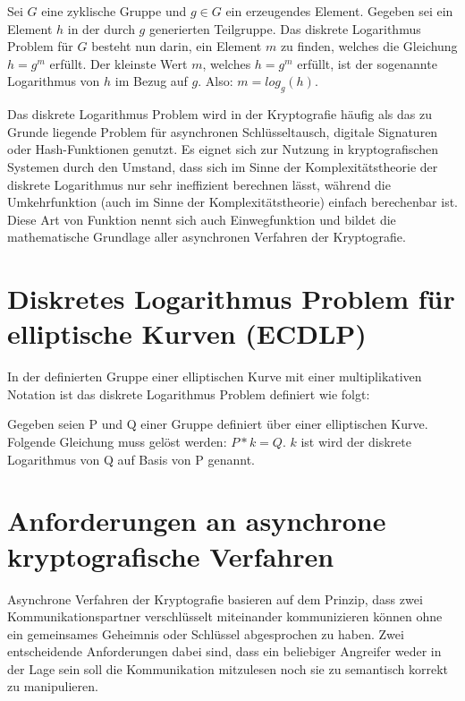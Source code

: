 Sei $ G $ eine zyklische Gruppe und $ g \in G $ ein erzeugendes Element. Gegeben sei ein Element $h$ in der durch $g$ generierten Teilgruppe.
Das diskrete Logarithmus Problem für $G$ besteht nun darin, ein Element $m$ zu finden, welches die Gleichung $ h = g^m $ erfüllt.
Der kleinste Wert $m$, welches $h = g^m$ erfüllt, ist der sogenannte Logarithmus von $h$ im Bezug auf $g$. Also: $m = log_g(h)$.

Das diskrete Logarithmus Problem wird in der Kryptografie häufig als das zu Grunde liegende Problem für asynchronen Schlüsseltausch, digitale Signaturen oder Hash-Funktionen genutzt. Es eignet sich zur Nutzung in kryptografischen
Systemen durch den Umstand, dass sich im Sinne der Komplexitätstheorie der diskrete Logarithmus nur sehr ineffizient
berechnen lässt, während die Umkehrfunktion (auch im Sinne der Komplexitätstheorie) einfach berechenbar ist.
Diese Art von Funktion nennt sich auch Einwegfunktion und bildet die mathematische Grundlage aller asynchronen 
Verfahren der Kryptografie.	

\section{Diskretes Logarithmus Problem für elliptische Kurven (ECDLP)}
In der definierten Gruppe einer elliptischen Kurve mit einer multiplikativen Notation
ist das diskrete Logarithmus Problem definiert wie folgt:

Gegeben seien P und Q einer Gruppe definiert über einer elliptischen Kurve.
Folgende Gleichung muss gelöst werden: $ P*k = Q $. $k$ ist wird der diskrete Logarithmus von Q
auf Basis von P genannt.

\newpage

\section{Anforderungen an asynchrone kryptografische Verfahren}

Asynchrone Verfahren der Kryptografie basieren auf dem Prinzip, dass zwei Kommunikationspartner verschlüsselt miteinander kommunizieren können ohne ein gemeinsames Geheimnis oder Schlüssel abgesprochen zu haben. Zwei entscheidende Anforderungen dabei sind, dass ein beliebiger Angreifer weder in der Lage sein soll die Kommunikation mitzulesen noch sie zu semantisch korrekt zu manipulieren.


